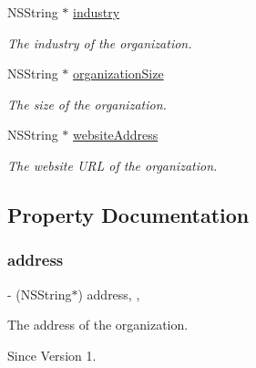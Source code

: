 \begin{DoxyCompactItemize}
N\+S\+String $\ast$ \hyperlink{class_x_i_organization_info_a9808d9486744ee25fad8cfefa9ecabf8}{industry}
\begin{DoxyCompactList}\small\item\em The industry of the organization. \end{DoxyCompactList}\item 
N\+S\+String $\ast$ \hyperlink{class_x_i_organization_info_aa9bfde1242f6e6699622347f6037dfa5}{organization\+Size}
\begin{DoxyCompactList}\small\item\em The size of the organization. \end{DoxyCompactList}\item 
N\+S\+String $\ast$ \hyperlink{class_x_i_organization_info_a93813b5143f43556adbd0ddd1fec09a7}{website\+Address}
\begin{DoxyCompactList}\small\item\em The website U\+RL of the organization. \end{DoxyCompactList}\end{DoxyCompactItemize}


\subsection{Property Documentation}
\hypertarget{class_x_i_organization_info_a9a6f2db2d2525929d9950866f407247b}{}\label{class_x_i_organization_info_a9a6f2db2d2525929d9950866f407247b} 
\subsubsection{\texorpdfstring{address}{address}}
{\footnotesize\ttfamily -\/ (N\+S\+String$\ast$) address\hspace{0.3cm}{\ttfamily [read]}, {\ttfamily [nonatomic]}, {\ttfamily [assign]}}



The address of the organization. 

\begin{DoxySince}{Since}
Version 1. 
\end{DoxySince}
\hypertarget{class_x_i_organization_info_ab31da34e4e82f33656a8959ef499a9cb}{}\label{class_x_i_organization_info_ab31da34e4e82f33656a8959ef499a9cb} 
